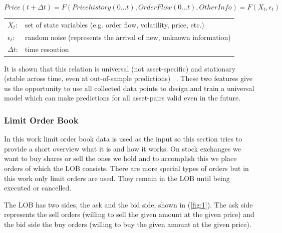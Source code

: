 \documentclass[11pt,a4paper,oneside]{article}
\begin{document}
  \begin{equation}
    Price(t+\Delta t) = F(Price history(0...t), Order Flow(0...t), Other Info) = F(X_{t}, \epsilon_{t})
    \label{eq:1}
  \end{equation}


  \begin{center}
    \begin{tabular}{l l}
      $X_{t}$: & set of state variables (e.g. order flow, volatility, price, etc.) \\
      $\epsilon_{t}$: & random noise (represents the arrival of new, unknown information) \\
      $\Delta t$: & time resoution
    \end{tabular}
  \end{center}

  \bigskip

  It is shown that this relation is universal (not asset-specific) and stationary (stable across time, even at 
  out-of-sample predictions) ~\cite{univ}. These two features give us the opportunity to use all collected data points 
  to design and train a universal model which can make predictions for all asset-pairs valid even in the future.

  \subsubsection{Limit Order Book}
  \label{sec:limit_order_book}
  
  In this work limit order book data is used as the input so this section tries to provide a short overview what it is 
  and how it works. On stock exchanges we want to buy shares or sell the ones we hold and to accomplish this we place 
  orders of which the LOB consists. There are more special types of orders but in this work only limit orders are used. 
  They remain in the LOB until being executed or cancelled.
  
  The LOB has two sides, the ask and the bid side, shown in (\ref{fig:1}). The ask side represents the sell orders 
  (willing to sell the given amount at the given price) and the bid side the buy orders (willing to buy the given amount 
  at the given price).
\end{document}
